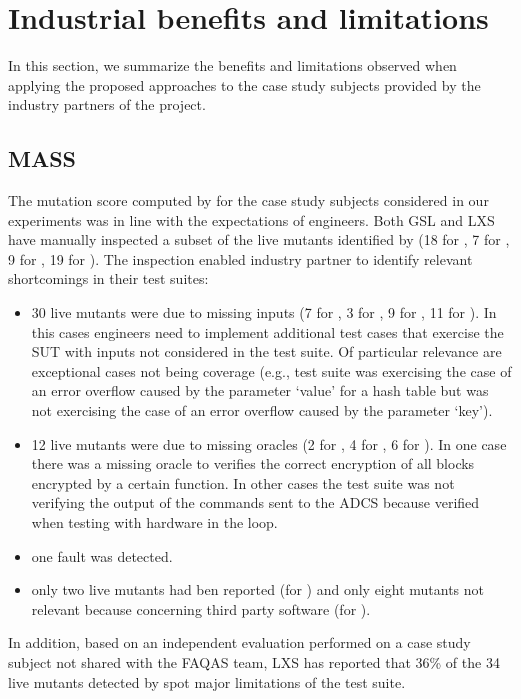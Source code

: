 \clearpage
\section{Industrial benefits and limitations}
\label{sec:EvaluationRemarks}

In this section, we summarize the benefits and limitations observed when applying the proposed approaches to the  case study subjects provided by the industry partners of the project.

\subsection*{MASS}

The mutation score computed by \MASS for the case study subjects considered in our experiments was in line with the expectations of engineers. Both GSL and LXS have manually inspected a subset of the live mutants identified by \MASS (18 for \UTIL, 7 for \GCSP, 9 for \PARAM, 19 for \ESAIL). The inspection enabled industry partner to identify relevant shortcomings in their test suites: 
\begin{itemize}
\item 30 live mutants were due to missing inputs (7 for \UTIL, 3 for \GCSP, 9 for \PARAM, 11 for \ESAIL). In this cases engineers need to implement additional test cases that exercise the SUT with inputs not considered in the test suite. Of particular relevance are exceptional cases not being coverage (e.g., test suite was exercising the case of an error overflow 
caused by the parameter ‘value’ for a hash table but was not exercising the case of an error overflow caused by the parameter ‘key’).
\item 12 live mutants were due to missing oracles (2 for \UTIL, 4 for \GCSP, 6 for \ESAIL). In one case there was a missing oracle to verifies the correct encryption of all blocks encrypted by a certain function. In other cases the test suite was not verifying the output of the commands sent to the ADCS because verified when testing with hardware in the loop.
\item one fault was detected.
\item only two live mutants had ben reported (for \ESAIL) and only eight mutants not relevant because concerning third party software (for \UTIL).
\end{itemize}

In addition, based on an independent evaluation performed on a case study subject not shared with the FAQAS team, LXS has reported that 36\% of the 34 live mutants detected by \MASS spot major limitations of the test suite.

